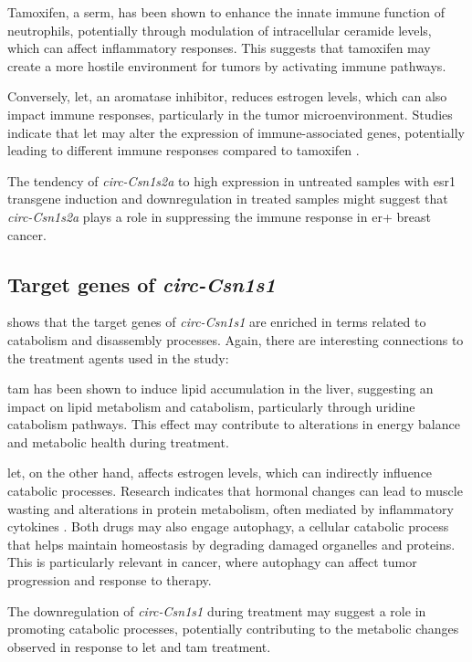 Tamoxifen, a \gls{serm}, has been shown to enhance the innate immune function
of neutrophils, potentially through modulation of intracellular ceramide
levels, which can affect inflammatory
responses\supercite{corriden_tamoxifen_2015}.
This suggests that tamoxifen may create a more hostile environment for tumors
by activating immune pathways.

Conversely, \gls{let}, an aromatase inhibitor, reduces estrogen levels, which
can also impact immune responses, particularly in the tumor microenvironment.
Studies indicate that \gls{let} may alter the expression of immune-associated
genes, potentially leading to different immune responses compared to tamoxifen
\supercite{dabydeen_comparison_2015}.

The tendency of \textit{circ-Csn1s2a} to high expression in untreated samples
with \gls{esr1} transgene induction and downregulation in treated samples might
suggest that \textit{circ-Csn1s2a} plays a role in suppressing the immune
response in \gls{er+} breast cancer.

\subsection{Target genes of \textit{circ-Csn1s1}}

 shows that the target genes of \textit{circ-Csn1s1} are
enriched in terms related to catabolism and disassembly processes.
Again, there are interesting connections to the treatment agents used in the
study: 

\Gls{tam} has been shown to induce lipid accumulation in the liver, suggesting
an impact on lipid metabolism and catabolism, particularly through uridine
catabolism pathways\supercite{le_uridine_2014}.
This effect may contribute to alterations in energy balance and metabolic
health during treatment.

\Gls{let}, on the other hand, affects estrogen levels, which can
indirectly influence catabolic processes.
Research indicates that hormonal changes can lead to muscle wasting and
alterations in protein metabolism, often mediated by inflammatory cytokines
\supercite{webster_inflammation_2020}.
Both drugs may also engage autophagy, a cellular catabolic process that helps
maintain homeostasis by degrading damaged organelles and
proteins\supercite{lee_molecular_2012}.
This is particularly relevant in cancer, where autophagy can affect tumor
progression and response to therapy.

The downregulation of \textit{circ-Csn1s1} during treatment may suggest a role
in promoting catabolic processes, potentially contributing to the metabolic
changes observed in response to \gls{let} and \gls{tam} treatment.
